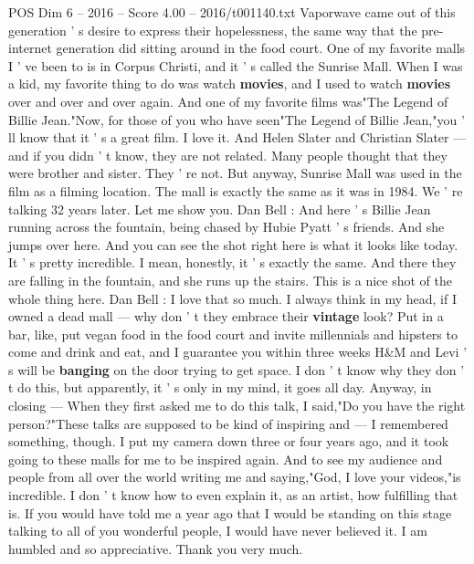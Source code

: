 \begin{textsample}{POS Dim 6 – 2016 – Score 4.00 – 2016/t001140.txt}
Vaporwave came out of this generation ' s desire to express their hopelessness, the same way that the pre-internet generation did sitting around in the food court.
One of my favorite malls I ' ve been to is in Corpus Christi, and it ' s called the Sunrise Mall.
When I was a kid, my favorite thing to do was watch \textbf{movies}, and I used to watch \textbf{movies} over and over and over again.
And one of my favorite films was"The Legend of Billie Jean."Now, for those of you who have seen"The Legend of Billie Jean,"you ' ll know that it ' s a great film.
I love it.
And Helen Slater and Christian Slater — and if you didn ' t know, they are not related.
Many people thought that they were brother and sister.
They ' re not.
But anyway, Sunrise Mall was used in the film as a filming location.
The mall is exactly the same as it was in 1984.
We ' re talking 32 years later.
Let me show you.
Dan Bell : And here ' s Billie Jean running across the fountain, being chased by Hubie Pyatt ' s friends.
And she jumps over here.
And you can see the shot right here is what it looks like today.
It ' s pretty incredible.
I mean, honestly, it ' s exactly the same.
And there they are falling in the fountain, and she runs up the stairs.
This is a nice shot of the whole thing here.
Dan Bell : I love that so much.
I always think in my head, if I owned a dead mall — why don ' t they embrace their \textbf{vintage} look?
Put in a bar, like, put vegan food in the food court and invite millennials and hipsters to come and drink and eat, and I guarantee you within three weeks H\&M and Levi ' s will be \textbf{banging} on the door trying to get space.
I don ' t know why they don ' t do this, but apparently, it ' s only in my mind, it goes all day.
Anyway, in closing — When they first asked me to do this talk, I said,"Do you have the right person?"These talks are supposed to be kind of inspiring and — I remembered something, though.
I put my camera down three or four years ago, and it took going to these malls for me to be inspired again.
And to see my audience and people from all over the world writing me and saying,"God, I love your videos,"is incredible.
I don ' t know how to even explain it, as an artist, how fulfilling that is.
If you would have told me a year ago that I would be standing on this stage talking to all of you wonderful people, I would have never believed it.
I am humbled and so appreciative.
Thank you very much.

\end{textsample}
